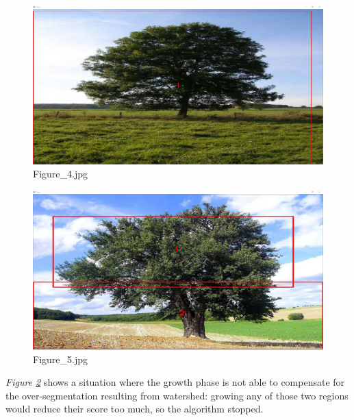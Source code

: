 \documentclass{article}
\begin{document}
\begin{figure}[h]
\begin{center}
\includegraphics[width=1\textwidth]{images/b4}
\caption{\footnotesize{Figure\_4.jpg}}
\label{img:benchmark4}
\end{center}
\end{figure}

\begin{figure}[h]
\begin{center}
\includegraphics[width=1\textwidth]{images/b5}
\caption{\footnotesize{Figure\_5.jpg}}
\label{img:benchmark5}
\end{center}
\end{figure}

\textit{Figure \ref{img:benchmark5}} shows a situation where the growth phase is not able to compensate for the over-segmentation resulting from watershed: growing any of those two regions would reduce their score too much, so the algorithm stopped.
\end{document}
